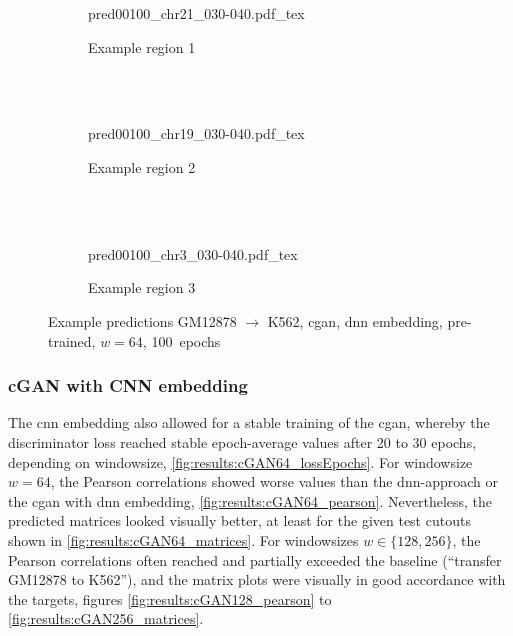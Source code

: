 \begin{figure}[p] %
    \begin{subfigure}{\textwidth}
        \centering
        \scriptsize
        {pred00100_chr21_030-040.pdf_tex}
        \caption{Example  region 1} \label{fig:results:cGAN64_pretrain-dnn_r1}
    \end{subfigure}\\[2mm]
    \\[3mm]
    \begin{subfigure}{\textwidth}
        \centering
        \scriptsize
        {pred00100_chr19_030-040.pdf_tex}
        \caption{Example region 2} \label{fig:results:cGAN64_pretrain-dnn_r2}
    \end{subfigure}\\[2mm]
    \\[3mm]
    \begin{subfigure}{\textwidth}
        \centering
        \scriptsize
        {pred00100_chr3_030-040.pdf_tex}
        \caption{Example region 3} \label{fig:results:cGAN64_pretrain-dnn_r3}
    \end{subfigure}
    \caption{Example predictions GM12878 $\rightarrow$ K562, \acrshort{cgan}, \acrshort{dnn} embedding, pre-trained, $w=64$, 100~epochs} \label{fig:results:cGAN64_pretrain-dnn_matrices}
\end{figure}


\subsubsection{cGAN with CNN embedding} \label{sec:results:cgan_cnn}
The \acrshort{cnn} embedding also allowed for a stable training of the \acrshort{cgan},
whereby the discriminator loss reached stable epoch-average values after 20 to 30 epochs, depending on windowsize, \cref{fig:results:cGAN64_lossEpochs}.
For windowsize $w=64$, the Pearson correlations showed worse values than the \acrshort{dnn}-approach or the \acrshort{cgan} with \acrshort{dnn} embedding, \cref{fig:results:cGAN64_pearson}.
Nevertheless, the predicted matrices looked visually better, at least for the given test cutouts shown in \cref{fig:results:cGAN64_matrices}. 
For windowsizes $w\in\{128,256\}$, the Pearson correlations often reached and partially exceeded the baseline (``transfer GM12878 to K562''),
and the matrix plots were visually in good accordance with the targets, figures \ref{fig:results:cGAN128_pearson} to \ref{fig:results:cGAN256_matrices}.

